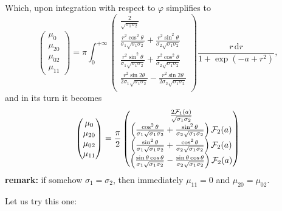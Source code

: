 \documentclass{article}
\begin{document}
Which, upon integration with respect to $\varphi$ simplifies to
\[
	\begin{pmatrix}
		\mu_0\\
		\mu_{20}\\
		\mu_{02}\\
		\mu_{11}
	\end{pmatrix}
	=\pi
	\int_{0}^{+\infty}\begin{pmatrix}
		\frac{2}{\sqrt{\sigma_1\sigma_2}}\\
	\frac{r^2\cos^2\theta}{\sigma_1\sqrt{\sigma_1\sigma_2}}+\frac{r^2\sin^2\theta}{\sigma_2\sqrt{\sigma_1\sigma_2}}\\
		\frac{r^2\sin^2\theta}{\sigma_1\sqrt{\sigma_1\sigma_2}}+\frac{r^2\cos^2\theta}{\sigma_2\sqrt{\sigma_1\sigma_2}}\\
		\frac{r^2\sin2\theta}{2\sigma_1\sqrt{\sigma_1\sigma_2}}-\frac{r^2\sin2\theta}{2\sigma_2\sqrt{\sigma_1\sigma_2}}\\
	\end{pmatrix}
	\frac{r\,\mathrm dr}{1+\exp(-a+r^2)},
\]
and in its turn it becomes
\[
	\begin{pmatrix}
		\mu_0\\
		\mu_{20}\\
		\mu_{02}\\
		\mu_{11}
	\end{pmatrix}
	=\frac{\pi}{2}
	\begin{pmatrix}
		\frac{2\mathcal F_1(a)}{\sqrt{\sigma_1\sigma_2}}\\
	\left(\frac{\cos^2\theta}{\sigma_1\sqrt{\sigma_1\sigma_2}}+\frac{\sin^2\theta}{\sigma_2\sqrt{\sigma_1\sigma_2}}\right)\mathcal F_2(a)\\
		\left(\frac{\sin^2\theta}{\sigma_1\sqrt{\sigma_1\sigma_2}}+\frac{\cos^2\theta}{\sigma_2\sqrt{\sigma_1\sigma_2}}\right)\mathcal F_2(a)\\
		\left(\frac{\sin\theta\cos\theta}{\sigma_1\sqrt{\sigma_1\sigma_2}}-\frac{\sin\theta\cos\theta}{\sigma_2\sqrt{\sigma_1\sigma_2}}\right)\mathcal F_2(a)\\
	\end{pmatrix}
\]
\textbf{remark:} if somehow $\sigma_1=\sigma_2$, then immediately $\mu_{11}=0$ and $\mu_{20}=\mu_{02}$.

Let us try this one:
\end{document}
